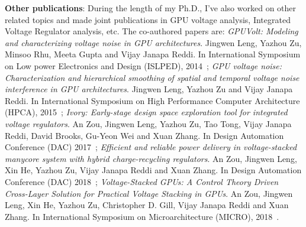 \textbf{Other publications}: During the length of my Ph.D., I've also worked on other related topics and made joint publications in GPU voltage analysis, Integrated Voltage Regulator analysis, etc. The co-authored papers are: \textit{GPUVolt: Modeling and characterizing voltage noise in GPU architectures}. Jingwen Leng, Yazhou Zu, Minsoo Rhu, Meeta Gupta and Vijay Janapa Reddi. In International Symposium on Low power Electronics and Design (ISLPED), 2014~\cite{leng2014gpuvolt}; \textit{GPU voltage noise: Characterization and hierarchical smoothing of spatial and temporal voltage noise interference in GPU architectures}. Jingwen Leng, Yazhou Zu and Vijay Janapa Reddi. In International Symposium on High Performance Computer Architecture (HPCA), 2015~\cite{leng2015gpu}; \textit{Ivory: Early-stage design space exploration tool for integrated voltage regulators}. An Zou, Jingwen Leng, Yazhou Zu, Tao Tong, Vijay Janapa Reddi, David Brooks, Gu-Yeon Wei and Xuan Zhang. In Design Automation Conference (DAC) 2017~\cite{zou2017ivory}; \textit{Efficient and reliable power delivery in voltage-stacked manycore system with hybrid charge-recycling regulators}. An Zou, Jingwen Leng, Xin He, Yazhou Zu, Vijay Janapa Reddi and Xuan Zhang. In Design Automation Conference (DAC) 2018~\cite{zou2018efficient}; \textit{Voltage-Stacked GPUs: A Control Theory Driven Cross-Layer Solution for Practical Voltage Stacking in GPUs}. An Zou, Jingwen Leng, Xin He, Yazhou Zu, Christopher D. Gill, Vijay Janapa Reddi and Xuan Zhang. In International Symposium on Microarchitecture (MICRO), 2018~\cite{an2018control}.